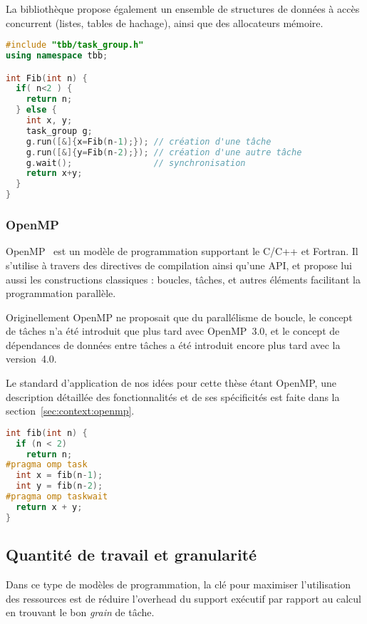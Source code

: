 La bibliothèque propose également un ensemble de structures de données à accès concurrent (listes, tables de hachage), ainsi que des allocateurs mémoire.

\begin{lstlisting}[language=c++,caption=Fibonacci exprimé en TBB,label=lst:context:tbb]
#include "tbb/task_group.h"
using namespace tbb;

int Fib(int n) {
  if( n<2 ) {
    return n;
  } else {
    int x, y;
    task_group g;
    g.run([&]{x=Fib(n-1);}); // création d'une tâche
    g.run([&]{y=Fib(n-2);}); // création d'une autre tâche
    g.wait();                // synchronisation
    return x+y;
  }
}
\end{lstlisting}

\subsubsection{OpenMP}

OpenMP~\cite{openmp45} est un modèle de programmation supportant le C/C++ et Fortran.
Il s'utilise à travers des directives de compilation ainsi qu'une API, et propose lui aussi les constructions classiques : boucles, tâches, et autres éléments facilitant la programmation parallèle.

Originellement OpenMP ne proposait que du parallélisme de boucle, le concept de tâches n'a été introduit que plus tard avec OpenMP~3.0, et le concept de dépendances de données entre tâches a été introduit encore plus tard avec la version~4.0.

Le standard d'application de nos idées pour cette thèse étant OpenMP, une description détaillée des fonctionnalités et de ses spécificités est faite dans la section~\ref{sec:context:openmp}.

\begin{lstlisting}[language=c++,caption=Fibonacci exprimé en OpenMP,label=lst:context:openmp]
int fib(int n) {
  if (n < 2)
    return n;
#pragma omp task
  int x = fib(n-1);
  int y = fib(n-2);
#pragma omp taskwait
  return x + y;
}
\end{lstlisting}

\subsection{Quantité de travail et granularité}\label{sec:context:others:granularity}


Dans ce type de modèles de programmation, la clé pour maximiser l'utilisation des ressources est de réduire l'overhead du support exécutif par rapport au calcul en trouvant le bon \emph{grain} de tâche.


